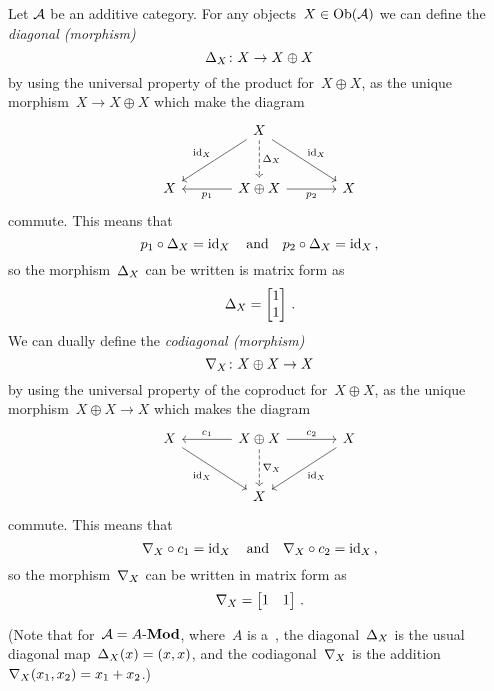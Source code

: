 \begin{remark}
  \label{sum via category structure}
  Let$~\mathcal{A}$ be an additive category.
  For any objects~$X \in \operatorname{Ob}(\mathcal{A})$ we can define the \emph{diagonal \textup(morphism\textup)}
  \[
            \Delta_X
    \colon  X
    \to     X \oplus X
  \]
  by using the universal property of the product for~$X \oplus X$, as the unique morphism~$X \to X \oplus X$ which make the diagram
  \[
    \begin{tikzcd}[sep = large]
        {}
      & X
        \arrow[dashed]{d}[right]{\diag_X}
        \arrow{dl}[above left]{\id_X}
        \arrow{dr}[above right]{\id_X}
      & {}
      \\
        X
      & X \oplus X
        \arrow{l}[below]{p_1}
        \arrow{r}[below]{p_2}
      & X
    \end{tikzcd}
  \]
  commute.
  This means that
  \[
    p_1 \circ \Delta_X = \operatorname{id}_X
    \quad\text{and}\quad
    p_2 \circ \Delta_X = \operatorname{id}_X \,,
  \]
  so the morphism~$\Delta_X$ can be written is matrix form as
  \[
      \Delta_X
    = \begin{bmatrix}
        1 \\ 1
      \end{bmatrix} \,.
  \]
  We can dually define the \emph{codiagonal \textup(morphism\textup)}
  \[
            \nabla_X
    \colon  X \oplus X
    \to     X
  \]
  by using the universal property of the coproduct for~$X \oplus X$, as the unique morphism~$X \oplus X \to X$ which makes the diagram
  \[
    \begin{tikzcd}[sep = large]
        X
        \arrow{dr}[below left]{\id_X}
      & X \oplus X
        \arrow[dashed]{d}[right]{\codiag_X}
        \arrow{l}[above]{c_1}
        \arrow{r}[above]{c_2}
      & X
        \arrow{dl}[below right]{\id_X}
      \\
        {}
      & X
      & {}
    \end{tikzcd}
  \]
  commute.
  This means that
  \[
    \nabla_X \circ c_1 = \operatorname{id}_X
    \quad\text{and}\quad
    \nabla_X \circ c_2 = \operatorname{id}_X \,,
  \]
  so the morphism~$\nabla_X$ can be written in matrix form as
  \[
      \nabla_X
    = \begin{bmatrix}
        1 & 1
      \end{bmatrix} \,.
  \]
  
  (Note that for~$\mathcal{A} = \text{$A$-$\mathbf{Mod}$}$, where~$A$ is a~{\kalg}, the diagonal~$\Delta_X$ is the usual diagonal map~$\Delta_X(x) = (x,x)$, and the codiagonal~$\nabla_X$ is the addition~$\nabla_X(x_1, x_2) = x_1 + x_2$.)
  

\end{remark}
